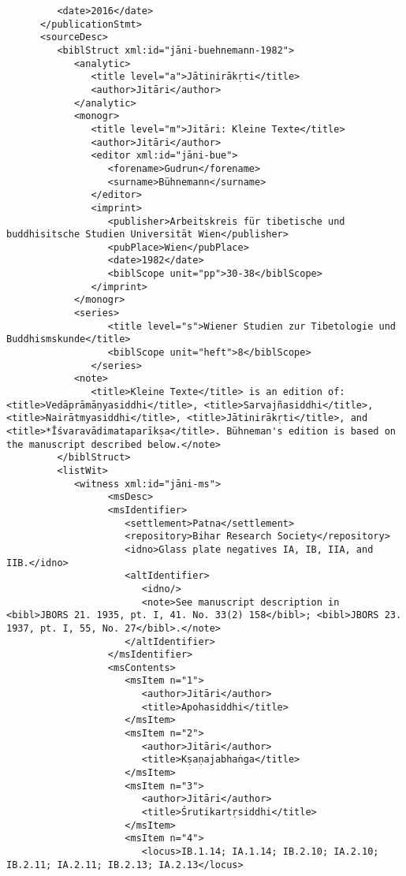 \documentclass[article,12pt,a4paper]{memoir}%
\begin{document}
\begin{verbatim}
         <date>2016</date>
      </publicationStmt>
      <sourceDesc>
         <biblStruct xml:id="jāni-buehnemann-1982">
            <analytic>
               <title level="a">Jātinirākṛti</title>
               <author>Jitāri</author>
            </analytic>
            <monogr>
               <title level="m">Jitāri: Kleine Texte</title>
               <author>Jitāri</author>
               <editor xml:id="jāni-bue">
                  <forename>Gudrun</forename> 
                  <surname>Bühnemann</surname>
               </editor>
               <imprint>
                  <publisher>Arbeitskreis für tibetische und buddhisitsche Studien Universität Wien</publisher>
                  <pubPlace>Wien</pubPlace>
                  <date>1982</date>
                  <biblScope unit="pp">30-38</biblScope>
               </imprint>
            </monogr>
            <series>
	              <title level="s">Wiener Studien zur Tibetologie und Buddhismskunde</title>
	              <biblScope unit="heft">8</biblScope>
	           </series>
            <note>
               <title>Kleine Texte</title> is an edition of: <title>Vedāprāmāṇyasiddhi</title>, <title>Sarvajñasiddhi</title>, <title>Nairātmyasiddhi</title>, <title>Jātinirākṛti</title>, and <title>*Īśvaravādimataparīkṣa</title>. Bühneman's edition is based on the manuscript described below.</note>
         </biblStruct>
         <listWit>
            <witness xml:id="jāni-ms">
	              <msDesc>
                  <msIdentifier>
                     <settlement>Patna</settlement>
                     <repository>Bihar Research Society</repository>
                     <idno>Glass plate negatives IA, IB, IIA, and  IIB.</idno>
                     <altIdentifier>
                        <idno/>
                        <note>See manuscript description in <bibl>JBORS 21. 1935, pt. I, 41. No. 33(2) 158</bibl>; <bibl>JBORS 23. 1937, pt. I, 55, No. 27</bibl>.</note>
                     </altIdentifier>
                  </msIdentifier>
                  <msContents>
                     <msItem n="1">
                        <author>Jitāri</author>
                        <title>Apohasiddhi</title>
                     </msItem>
                     <msItem n="2">
                        <author>Jitāri</author>
                        <title>Kṣaṇajabhaṅga</title>
                     </msItem>
                     <msItem n="3">
                        <author>Jitāri</author>
                        <title>Śrutikartṛsiddhi</title>
                     </msItem>
                     <msItem n="4">
                        <locus>IB.1.14; IA.1.14; IB.2.10; IA.2.10; IB.2.11; IA.2.11; IB.2.13; IA.2.13</locus>

\end{verbatim}
\end{document}

